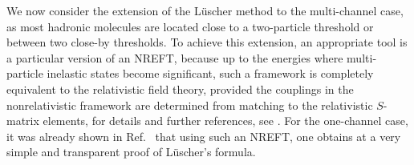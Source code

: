 We now consider the extension of the L\"uscher method to the multi-channel
case, as most hadronic molecules are located close to a two-particle threshold
or between two close-by thresholds. To achieve this extension, an 
appropriate tool is a particular version of an NREFT,
because up to the energies where multi-particle inelastic states become
significant, such a framework is completely equivalent to the relativistic
field theory, provided the couplings in the nonrelativistic framework
are determined from matching to the relativistic $S$-matrix elements, for
details and further references, see \cite{Bernard:2008ax,Colangelo:2006va,Gasser:2011ju}. For the one-channel case, it was already shown in 
Ref.~\cite{Beane:2003yx}
that using such an NREFT, one obtains at a very simple and transparent 
proof of L\"uscher's formula.

